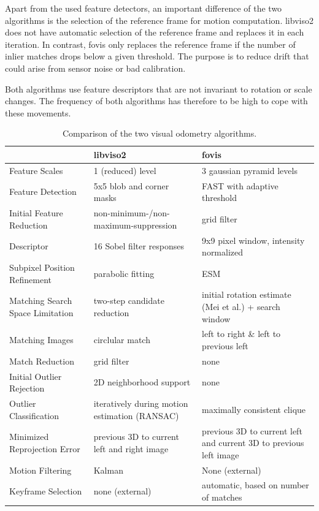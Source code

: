\documentclass[conference]{IEEEtran}
\begin{document}
Apart from the used feature detectors, an important difference of the two algorithms is the selection of the reference frame for motion computation. libviso2 does not have automatic selection of the reference frame and replaces it in each iteration. In contrast, fovis only replaces the reference frame if the number of inlier matches drops below a given threshold. The purpose is to reduce drift that could arise from sensor noise or bad calibration.

Both algorithms use feature descriptors that are not invariant to rotation or scale changes. The frequency of both algorithms has therefore to be high to cope with these movements.

\begin{table}[ht]
  \caption{Comparison of the two visual odometry algorithms.}
  \label{odometry-comparison}
  \begin{tabularx}{\linewidth}{l|X|X}
    & \textbf{libviso2} & \textbf{fovis}  \\
    \hline
    Feature Scales                  & 1 (reduced) level & 3 gaussian pyramid levels \\[3pt]
    Feature Detection               & 5x5 blob and corner masks & FAST with adaptive threshold  \\[3pt]
    Initial Feature Reduction       & non-minimum-/non-maximum-suppression & grid filter \\[3pt]
    Descriptor                      & 16 Sobel filter responses & 9x9 pixel window, intensity normalized \\[3pt]
    Subpixel Position Refinement    & parabolic fitting & ESM \\[3pt]
    \hline
    Matching Search Space Limitation & two-step candidate reduction & initial rotation estimate (Mei et al.) + search window \\[3pt]
    Matching Images                 & circlular match & left to right \& left to previous left \\[3pt]
    Match Reduction                 & grid filter & none \\[3pt]
    \hline
    Initial Outlier Rejection       & 2D neighborhood support & none \\[3pt]
    Outlier Classification          & iteratively during motion estimation (RANSAC) & maximally consistent clique \\[3pt]
    Minimized Reprojection Error    & previous 3D to current left and right image & previous 3D to current left and current 3D to previous left image \\[3pt]
    \hline
    Motion Filtering                & Kalman & None (external) \\[3pt]
    Keyframe Selection              & none (external) & automatic, based on number of matches \\[3pt]
  \end{tabularx}
\end{table}
\end{document}
